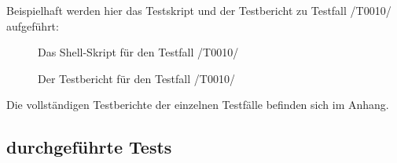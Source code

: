 \documentclass[11pt,a4paper]{scrartcl}
\begin{document}
Beispielhaft werden hier das Testskript und der Testbericht zu Testfall /T0010/ aufgeführt:

\begin{figure}[H]
\caption{Das Shell-Skript für den Testfall /T0010/}
\end{figure}

\begin{figure}[H]
\caption{Der Testbericht für den Testfall /T0010/}
\end{figure}

Die vollständigen Testberichte der einzelnen Testfälle befinden sich im Anhang.

\newpage

\subsection{durchgeführte Tests}
\end{document}
